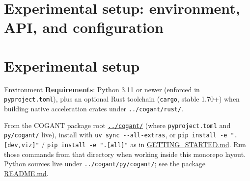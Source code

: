 \documentclass[
  ignorenonframetext,
]{beamer}
\author{\texorpdfstring{}{}}
\date{}
\begin{document}
\section{Experimental setup: environment, API, and
configuration}\label{experimental-setup-environment-api-and-configuration}

\section{Experimental setup}\label{experimental-setup}

\begin{frame}[fragile]{Environment}
\protect{}\label{environment}
\textbf{Requirements}: Python 3.11 or newer (enforced in
\texttt{pyproject.toml}), plus an optional Rust toolchain
(\texttt{cargo}, stable 1.70+) when building native acceleration crates
under \texttt{../cogant/rust/}.

From the COGANT package root \href{../cogant/}{\texttt{../cogant/}}
(where \texttt{pyproject.toml} and \texttt{py/cogant/} live), install
with \texttt{uv\ sync\ -\/-all-extras}, or
\texttt{pip\ install\ -e\ ".{[}dev,viz{]}"} /
\texttt{pip\ install\ -e\ ".{[}all{]}"} as in
\href{../cogant/GETTING_STARTED.md}{GETTING\_STARTED.md}. Run those
commands from that directory when working inside this monorepo layout.
Python sources live under
\href{../cogant/py/cogant/}{\texttt{../cogant/py/cogant/}}; see the
package \href{../cogant/README.md}{README.md}.
\end{frame}
\end{document}
